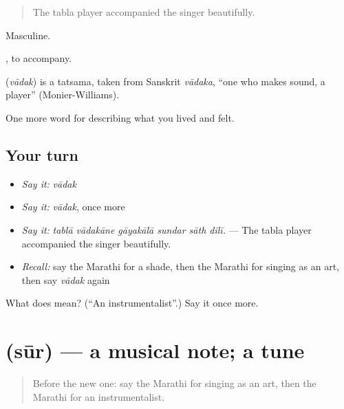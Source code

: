 \begin{quote}
The tabla player accompanied the singer beautifully.
\end{quote}

Masculine.

 , to accompany.

\begin{cousinweb}
\textbf{} (\emph{vādak}) is a tatsama, taken from Sanskrit \emph{vādaka}, \textquotedblleft{}one who makes sound, a player\textquotedblright{} (Monier-Williams).
\end{cousinweb}

\begin{grammarlens}[title={What you've built}]
One more word for describing what you lived and felt.
\end{grammarlens}

\subsection*{Your turn}
\begin{itemize}
\raggedright
  \item \emph{Say it:} \emph{vādak}
  \item \emph{Say it:} \emph{vādak}, once more
  \item \emph{Say it:} \emph{tablā vādakāne gāyakālā sundar sāth dilī.} — The tabla player accompanied the singer beautifully.
  \item \emph{Recall:} say the Marathi for a shade, then the Marathi for singing as an art, then say \emph{vādak} again
\end{itemize}

\begin{tcolorbox}[breakable,colback=teal!4,colframe=teal!35!black,title={Before you move on}]
What does  mean? (\textquotedblleft{}An instrumentalist\textquotedblright{}.) Say it once more.
\end{tcolorbox}
\section[\texorpdfstring{\mr{सूर} (sūr)}{सूर (sūr)}]{ (sūr) — a musical note; a tune}

\label{lesson:MR-C536-sur-note}



\begin{quote}
Before the new one: say the Marathi for singing as an art, then the Marathi for an instrumentalist.
\end{quote}

